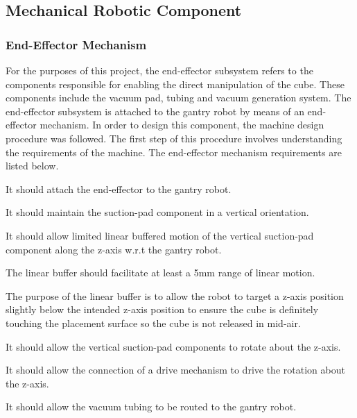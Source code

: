 \subsection{Mechanical Robotic Component} \label{sec:Mechancial Robotic Component}

\subsubsection{End-Effector Mechanism} \label{sec:End-Effector Mechanism}

For the purposes of this project, the end-effector subsystem refers to the components responsible for enabling the direct manipulation of the cube. These components include the vacuum pad, tubing and vacuum generation system. The end-effector subsystem is attached to the gantry robot by means of an end-effector mechanism. In order to design this component, the machine design procedure was followed. The first step of this procedure involves understanding the requirements of the machine. The end-effector mechanism requirements are listed below.

\begin{compactitem}
	\item It should attach the end-effector to the gantry robot.
	\item It should maintain the suction-pad component in a vertical orientation.
	\item It should allow limited linear buffered motion of the vertical suction-pad component along the z-axis w.r.t the gantry robot.
	\item The linear buffer should facilitate at least a 5mm range of linear motion.
	\item The purpose of the linear buffer is to allow the robot to target a z-axis position slightly below the intended z-axis position to ensure the cube is definitely touching the placement surface so the cube is not released in mid-air.
	\item It should allow the vertical suction-pad components to rotate about the z-axis.
	\item It should allow the connection of a drive mechanism to drive the rotation about the z-axis.
	\item It should allow the vacuum tubing to be routed to the gantry robot.
\end{compactitem}

